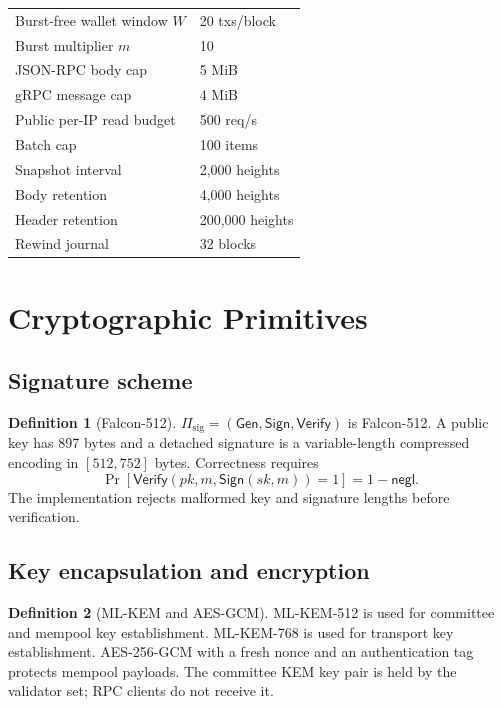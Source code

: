 \documentclass[11pt,a4paper]{article}
\theoremstyle{definition}
\newtheorem{definition}{Definition}[section]
\theoremstyle{plain}
\begin{document}
\begin{center}
\begin{longtable}{@{}p{}p{}@{}}
Burst-free wallet window $W$ & 20 txs/block \\
Burst multiplier $m$ & 10 \\
JSON-RPC body cap & 5 MiB \\
gRPC message cap & 4 MiB \\
Public per-IP read budget & 500 req/s \\
Batch cap & 100 items \\
Snapshot interval & 2,000 heights \\
Body retention & 4,000 heights \\
Header retention & 200,000 heights \\
Rewind journal & 32 blocks \\
\bottomrule
\end{longtable}
\end{center}

\section{Cryptographic Primitives}

\subsection{Signature scheme}

\begin{definition}[Falcon-512]
$\Pi_{\mathrm{sig}}=(\mathsf{Gen},\mathsf{Sign},\mathsf{Verify})$ is
Falcon-512. A public key has 897 bytes and a detached signature is a
variable-length compressed encoding in $[512,752]$ bytes. Correctness requires
\[
  \Pr[\mathsf{Verify}(pk,m,\mathsf{Sign}(sk,m))=1]=1-\mathsf{negl}.
\]
The implementation rejects malformed key and signature lengths before
verification.
\end{definition}

\subsection{Key encapsulation and encryption}

\begin{definition}[ML-KEM and AES-GCM]
ML-KEM-512 is used for committee and mempool key establishment. ML-KEM-768 is
used for transport key establishment. AES-256-GCM with a fresh nonce and an
authentication tag protects mempool payloads. The committee KEM key pair is
held by the validator set; RPC clients do not receive it.
\end{definition}
\end{document}
